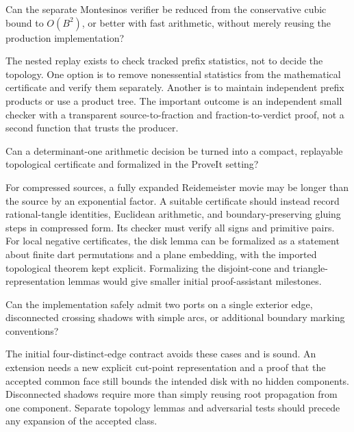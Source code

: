 \begin{researchquestion}
Can the separate Montesinos verifier be reduced from the conservative
cubic bound to \(O(B^2)\), or better with fast arithmetic, without merely
reusing the production implementation?
\end{researchquestion}
The nested replay exists to check tracked prefix statistics, not to decide
the topology. One option is to remove nonessential statistics from the
mathematical certificate and verify them separately. Another is to maintain
independent prefix products or use a product tree. The important outcome is
an independent small checker with a transparent source-to-fraction and
fraction-to-verdict proof, not a second function that trusts the producer.

\begin{researchquestion}
Can a determinant-one arithmetic decision be turned into a compact,
replayable topological certificate and formalized in the ProveIt setting?
\end{researchquestion}
For compressed sources, a fully expanded Reidemeister movie may be longer
than the source by an exponential factor. A suitable certificate should
instead record rational-tangle identities, Euclidean arithmetic, and
boundary-preserving gluing steps in compressed form. Its checker must
verify all signs and primitive pairs. For local negative certificates,
the disk lemma can be formalized as a statement about finite dart
permutations and a plane embedding, with the imported topological theorem
kept explicit. Formalizing the disjoint-cone and triangle-representation
lemmas would give smaller initial proof-assistant milestones.

\begin{researchquestion}
Can the implementation safely admit two ports on a single exterior edge,
disconnected crossing shadows with simple arcs, or additional boundary
marking conventions?
\end{researchquestion}
The initial four-distinct-edge contract avoids these cases and is sound.
An extension needs a new explicit cut-point representation and a proof
that the accepted common face still bounds the intended disk with no
hidden components. Disconnected shadows require more than simply
reusing root propagation from one component. Separate topology lemmas
and adversarial tests should precede any expansion of the accepted class.

